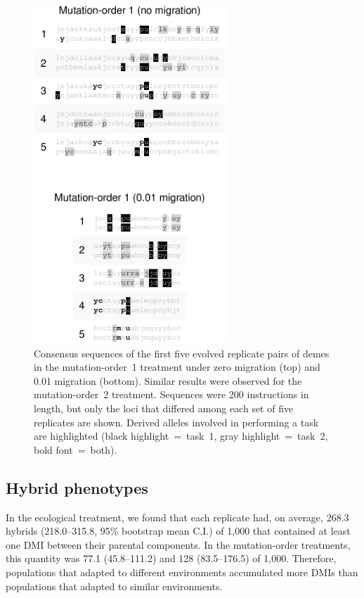 \begin{doublespace}
\begin{figure}
\centering
\includegraphics[height=5in]{task-muts.pdf}
\caption{Consensus sequences of the first five evolved replicate pairs of demes
  in the mutation-order~1 treatment under zero migration (top)
  and 0.01 migration (bottom).
  Similar results were observed for the mutation-order~2 treatment.
  Sequences were 200 instructions in length,
  but only the loci that differed among
  each set of five replicates are shown.
  Derived alleles involved in performing a task are highlighted
  (black highlight~=~task~1, gray highlight~=~task~2, bold font~=~both).}
\label{task_muts}
\end{figure}



\subsection{Hybrid phenotypes}

In the ecological treatment,
we found that each replicate had, on average,
268.3 hybrids (218.0--315.8, 95\% bootstrap mean C.I.) of 1,000
that contained at least one DMI between their parental components.
%
In the mutation-order treatments,
this quantity was 77.1 (45.8--111.2) and 128 (83.5--176.5) of 1,000.
%
Therefore, populations that adapted to different environments
accumulated more DMIs than populations that adapted to similar environments.




\end{doublespace}
